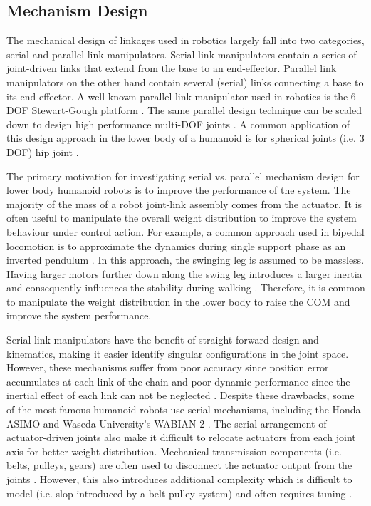 

\subsection{Mechanism Design} %
\label{sub:related_mechanism_design}
The mechanical design of linkages used in robotics largely fall into two categories, serial and parallel link manipulators. Serial link manipulators contain a series of joint-driven links that extend from the base to an end-effector. Parallel link manipulators on the other hand contain several (serial) links connecting a base to its end-effector. A well-known parallel link manipulator used in robotics is the 6 DOF Stewart-Gough platform \cite{Dasgupta2000,Sugahara2005}. The same parallel design technique can be scaled down to design high performance multi-DOF joints \cite{Gosselin1994}. A common application of this design approach in the lower body of a humanoid is for spherical joints (i.e. 3 DOF) hip joint \cite{Hofschulte2005}. 

The primary motivation for investigating serial vs. parallel mechanism design for lower body humanoid robots is to improve the performance of the system. The majority of the mass of a robot joint-link assembly comes from the actuator. It is often useful to manipulate the overall weight distribution to improve the system behaviour under control action. For example, a common approach used in bipedal locomotion is to approximate the dynamics during single support phase as an  inverted pendulum \cite{Kajita1992}. In this approach, the swinging leg is assumed to be massless. Having larger motors further down along the swing leg introduces a larger inertia and consequently influences the stability during walking \cite{Morisawa2000}. Therefore, it is common to manipulate the weight distribution in the lower body to raise the COM and improve the system performance. 

Serial link manipulators have the benefit of straight forward design and kinematics, making it easier identify singular configurations in the joint space. However, these mechanisms suffer from poor accuracy since position error accumulates at each link of the chain and poor dynamic performance since the inertial effect of each link can not be neglected \cite{Merlet2006}. Despite these drawbacks, some of the most famous humanoid robots use serial mechanisms, including the Honda ASIMO \cite{Sakagami:2002cf} and Waseda University's WABIAN-2 \cite{Ogura:2006bm}. The serial arrangement of actuator-driven joints also make it difficult to relocate actuators from each joint axis for better weight distribution. Mechanical transmission components (i.e. belts, pulleys, gears) are often used to disconnect the actuator output from the joints \cite{Ogura:2006bm}. However, this also introduces additional complexity which is difficult to model (i.e. slop introduced by a belt-pulley system) and often requires tuning \cite{IllWooPark:2005et}. 

